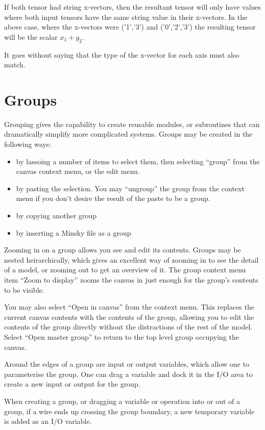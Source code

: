 If both tensor had string x-vectors, then the resultant tensor will
only have values where both input tensors have the same string value
in their x-vectors. In the above case, where the x-vectors were
('1','3') and ('0','2','3') the resulting tensor will be the scalar $x_1+y_2$.

It goes without saying that the type of the x-vector for each axis
must also match.

\section{Groups}\label{Group}

Grouping gives the capability to create reusable modules, or subroutines that
can dramatically simplify more complicated systems. Groups may be
created in the following ways:
\begin{itemize}
\item by lassoing a number of items to select them, then selecting
``group'' from the canvas context menu, or the edit menu.
\item by pasting the selection. You may ``ungroup'' the group from the
context menu if you don't desire the result of the paste to be a group.
\item by copying another group
\item by inserting a Minsky file as a group
\end{itemize}

Zooming in on a group allows you see and edit its contents. Groups may
be nested heirarchically, which gives an excellent way of zooming in
to see the detail of a model, or zooming out to get an overview of
it. The group context menu item ``Zoom to display'' zooms the canvas
in just enough for the group's contents to be visible.

You may also select ``Open in canvas'' from the context menu. This
replaces the current canvas contents with the contents of the group,
allowing you to edit the contents of the group directly without the
distractions of the rest of the model. Select ``Open master group'' to
return to the top level group occupying the canvas.

Around the edges of a group are input or output variables, which allow
one to parameterise the group. One can drag a variable and dock it in
the I/O area to create a new input or output for the group.

When creating a group, or dragging a variable or operation into or out
of a group, if a wire ends up crossing the group boundary, a new
temporary variable is added as an I/O variable.

